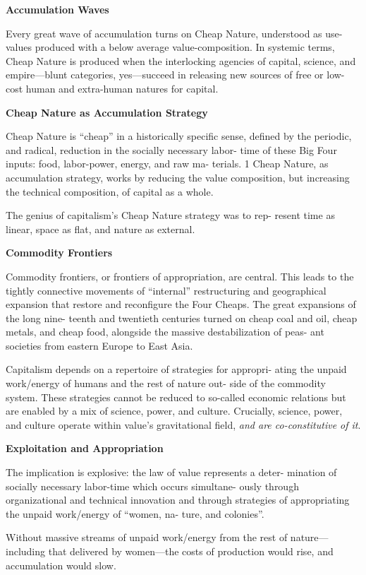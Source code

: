 \documentclass[
]{book}
\begin{document}
\textbf{Accumulation Waves}

Every great wave of accumulation turns on Cheap Nature, understood as use-values produced with
a below average value-composition. In systemic terms, Cheap Nature
is produced when the interlocking agencies of capital, science, and
empire---blunt categories, yes---succeed in releasing new sources of
free or low-cost human and extra-human natures for capital.

\textbf{Cheap Nature as Accumulation Strategy}

Cheap Nature is ``cheap'' in a historically specific sense, defined
by the periodic, and radical, reduction in the socially necessary labor-
time of these Big Four inputs: food, labor-power, energy, and raw ma-
terials. 1 Cheap Nature, as accumulation strategy, works by reducing
the value composition, but increasing the technical composition, of
capital as a whole.

The genius of capitalism's Cheap Nature strategy was to rep-
resent time as linear, space as flat, and nature as external.

\textbf{Commodity Frontiers}

Commodity frontiers, or frontiers of appropriation, are central.
This leads to the tightly connective movements of
``internal'' restructuring and geographical expansion that restore and
reconfigure the Four Cheaps. The great expansions of the long nine-
teenth and twentieth centuries turned on cheap coal and oil, cheap
metals, and cheap food, alongside the massive destabilization of peas-
ant societies from eastern Europe to East Asia.

Capitalism depends on a repertoire of strategies for appropri-
ating the unpaid work/energy of humans and the rest of nature out-
side of the commodity system. These strategies cannot be reduced to
so-called economic relations but are enabled by a mix of science,
power, and culture. Crucially, science, power, and culture operate
within value's gravitational field, \emph{and are co-constitutive of it}.

\textbf{Exploitation and Appropriation}

The implication is explosive: the law of value represents a deter-
mination of socially necessary labor-time which occurs simultane-
ously through organizational and technical innovation and through
strategies of appropriating the unpaid work/energy of ``women, na-
ture, and colonies''.

Without massive streams of unpaid work/energy from the rest of
nature---including that delivered by women---the costs of production would rise,
and accumulation would slow.
\end{document}
